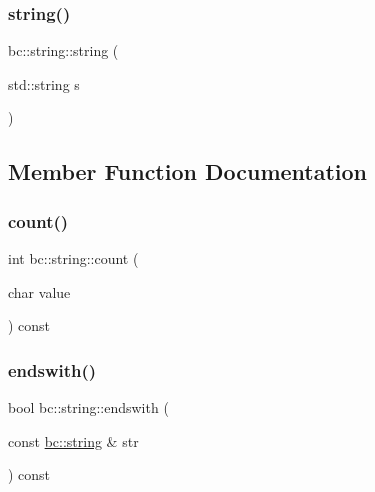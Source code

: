 \mbox{\label{structbc_1_1string_ab6a5b41e2db3d0efef579df370105625}} 
\subsubsection{\texorpdfstring{string()}{string()}\hspace{0.1cm}{\footnotesize\ttfamily [4/4]}}
{\footnotesize\ttfamily bc\+::string\+::string (\begin{DoxyParamCaption}\item[{std\+::string}]{s }\end{DoxyParamCaption})\hspace{0.3cm}{\ttfamily [inline]}}



\subsection{Member Function Documentation}
\mbox{\label{structbc_1_1string_ab434782ceccd7373dbf8bfdb546e35b0}} 
\subsubsection{\texorpdfstring{count()}{count()}}
{\footnotesize\ttfamily int bc\+::string\+::count (\begin{DoxyParamCaption}\item[{char}]{value }\end{DoxyParamCaption}) const\hspace{0.3cm}{\ttfamily [inline]}}

\mbox{\label{structbc_1_1string_aa939350fbd278d9a7848bccca012b065}} 
\subsubsection{\texorpdfstring{endswith()}{endswith()}\hspace{0.1cm}{\footnotesize\ttfamily [1/2]}}
{\footnotesize\ttfamily bool bc\+::string\+::endswith (\begin{DoxyParamCaption}\item[{const \hyperlink{structbc_1_1string}{bc\+::string} \&}]{str }\end{DoxyParamCaption}) const\hspace{0.3cm}{\ttfamily [inline]}}

